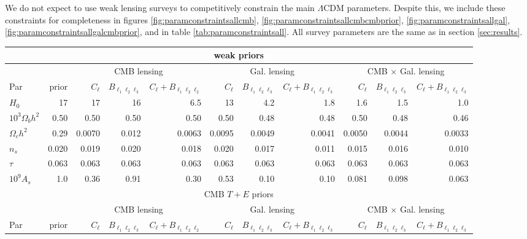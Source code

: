 \documentclass[11pt]{article} %
\begin{document}
We do not expect to use weak lensing surveys to competitively constrain the main $\Lambda$CDM parameters. Despite this, we include these constraints for completeness in figures \ref{fig:paramconstraintsallcmb}, \ref{fig:paramconstraintsallcmbcmbprior}, \ref{fig:paramconstraintsallgal}, \ref{fig:paramconstraintsallgalcmbprior}, and in table \ref{tab:paramconstraintsall}. All survey parameters are the same as in section \ref{sec:results}.
\begin{table}[h!]
    \centering
    \tiny
\begin{tabular}{|l|r|rrr|rrr|rrr|}
    \hline
    \multicolumn{11}{|c|}{weak priors} \\
    \hline
    && \multicolumn{3}{c|}{CMB lensing} & \multicolumn{3}{c|}{Gal. lensing} & \multicolumn{3}{c|}{CMB $\times$ Gal. lensing} \\
    \hline
    Par & prior & $C_\ell$ & $B_{\ell_1\ell_2\ell_3}$ & $C_\ell + B_{\ell_1\ell_2\ell_2}$ & $C_\ell$ & $B_{\ell_1\ell_2\ell_3}$ & $C_\ell + B_{\ell_1\ell_2\ell_3}$ & $C_\ell$ & $B_{\ell_1\ell_2\ell_3}$ & $C_\ell + B_{\ell_1\ell_2\ell_3}$ \\
    \hline
$H_0$              & 17    & 17    & 16    & 6.5   & 13    & 4.2   & 1.8   & 1.6   & 1.5   & 1.0   \\
$10^3 \Omega_b h^2$ & 0.50  & 0.50  & 0.50  & 0.50  & 0.50  & 0.48  & 0.48  & 0.50  & 0.48  & 0.46  \\
$\Omega_c h^2$     & 0.29  & 0.0070& 0.012 & 0.0063& 0.0095& 0.0049& 0.0041& 0.0050& 0.0044& 0.0033\\
$n_s$              & 0.020 & 0.019 & 0.020 & 0.018 & 0.020 & 0.017 & 0.011 & 0.015 & 0.016 & 0.010 \\
$\tau$             & 0.063 & 0.063 & 0.063 & 0.063 & 0.063 & 0.063 & 0.063 & 0.063 & 0.063 & 0.063 \\
$10^9 A_s$         & 1.0   & 0.36  & 0.91  & 0.30  & 0.53  & 0.10  & 0.10  & 0.081 & 0.098 & 0.063 \\
    \hline
    \multicolumn{11}{|c|}{CMB $T + E$ priors} \\
    \hline
    && \multicolumn{3}{c|}{CMB lensing} & \multicolumn{3}{c|}{Gal. lensing} & \multicolumn{3}{c|}{CMB $\times$ Gal. lensing} \\
    \hline
Par & prior & $C_\ell$ & $B_{\ell_1\ell_2\ell_3}$ & $C_\ell + B_{\ell_1\ell_2\ell_2}$ & $C_\ell$ & $B_{\ell_1\ell_2\ell_3}$ & $C_\ell + B_{\ell_1\ell_2\ell_3}$ & $C_\ell$ & $B_{\ell_1\ell_2\ell_3}$ & $C_\ell + B_{\ell_1\ell_2\ell_3}$ \\
\hline

\end{tabular}
\end{table}
\end{document}
